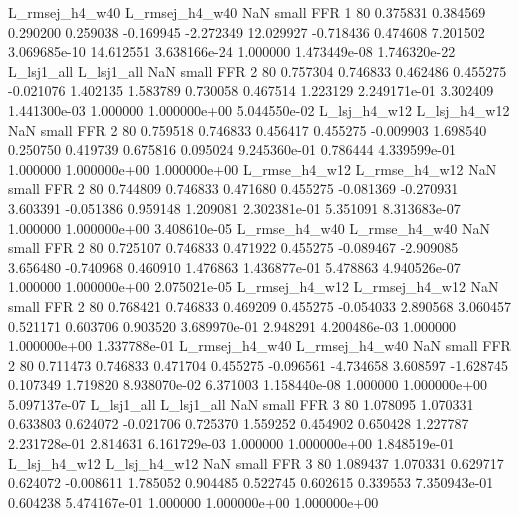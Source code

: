 L_rmsej_h4_w40 L_rmsej_h4_w40                   NaN      small      FFR                 1 80 0.375831       0.384569 0.290200       0.259038   -0.169945     -2.272349     12.029927    -0.718436       0.474608  7.201502 3.069685e-10    14.612551   3.638166e-24            1.000000    1.473449e-08        1.746320e-22
    L_lsj1_all     L_lsj1_all                   NaN      small      FFR                 2 80 0.757304       0.746833 0.462486       0.455275   -0.021076      1.402135      1.583789     0.730058       0.467514  1.223129 2.249171e-01     3.302409   1.441300e-03            1.000000    1.000000e+00        5.044550e-02
  L_lsj_h4_w12   L_lsj_h4_w12                   NaN      small      FFR                 2 80 0.759518       0.746833 0.456417       0.455275   -0.009903      1.698540      0.250750     0.419739       0.675816  0.095024 9.245360e-01     0.786444   4.339599e-01            1.000000    1.000000e+00        1.000000e+00
 L_rmse_h4_w12  L_rmse_h4_w12                   NaN      small      FFR                 2 80 0.744809       0.746833 0.471680       0.455275   -0.081369     -0.270931      3.603391    -0.051386       0.959148  1.209081 2.302381e-01     5.351091   8.313683e-07            1.000000    1.000000e+00        3.408610e-05
 L_rmse_h4_w40  L_rmse_h4_w40                   NaN      small      FFR                 2 80 0.725107       0.746833 0.471922       0.455275   -0.089467     -2.909085      3.656480    -0.740968       0.460910  1.476863 1.436877e-01     5.478863   4.940526e-07            1.000000    1.000000e+00        2.075021e-05
L_rmsej_h4_w12 L_rmsej_h4_w12                   NaN      small      FFR                 2 80 0.768421       0.746833 0.469209       0.455275   -0.054033      2.890568      3.060457     0.521171       0.603706  0.903520 3.689970e-01     2.948291   4.200486e-03            1.000000    1.000000e+00        1.337788e-01
L_rmsej_h4_w40 L_rmsej_h4_w40                   NaN      small      FFR                 2 80 0.711473       0.746833 0.471704       0.455275   -0.096561     -4.734658      3.608597    -1.628745       0.107349  1.719820 8.938070e-02     6.371003   1.158440e-08            1.000000    1.000000e+00        5.097137e-07
    L_lsj1_all     L_lsj1_all                   NaN      small      FFR                 3 80 1.078095       1.070331 0.633803       0.624072   -0.021706      0.725370      1.559252     0.454902       0.650428  1.227787 2.231728e-01     2.814631   6.161729e-03            1.000000    1.000000e+00        1.848519e-01
  L_lsj_h4_w12   L_lsj_h4_w12                   NaN      small      FFR                 3 80 1.089437       1.070331 0.629717       0.624072   -0.008611      1.785052      0.904485     0.522745       0.602615  0.339553 7.350943e-01     0.604238   5.474167e-01            1.000000    1.000000e+00        1.000000e+00
